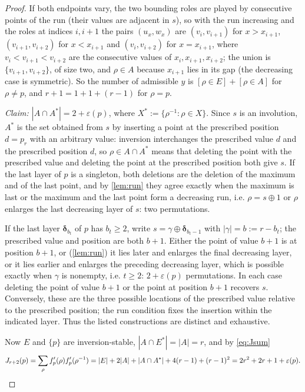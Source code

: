 \documentclass[11pt,reqno]{amsart}
\theoremstyle{plain}
\theoremstyle{definition}
\theoremstyle{remark}
\newcommand{\dd}{\boldsymbol{\delta}}
\newcommand{\bb}[1]{\left[#1\right]}
\begin{document}
\begin{proof}
If both endpoints vary, the two bounding roles are played by consecutive points of the run (their values are adjacent in $s$), so with the run increasing and the roles at indices $i,i+1$ the pairs $(u_x,w_x)$ are $(v_i,v_{i+1})$ for $x>x_{i+1}$, $(v_{i+1},v_{i+2})$ for $x<x_{i+1}$ and $(v_i,v_{i+2})$ for $x=x_{i+1}$, where $v_i<v_{i+1}<v_{i+2}$ are the consecutive values of $x_i,x_{i+1},x_{i+2}$; the union is $\{v_{i+1},v_{i+2}\}$, of size two, and $\rho\in A$ because $x_{i+1}$ lies in its gap (the decreasing case is symmetric). So the number of admissible $y$ is $\bb{\rho\in E}+\bb{\rho\in A}$ for $\rho\ne p$, and $r+1=1+1+(r-1)$ for $\rho=p$.

\emph{Claim: $|A\cap A^{*}|=2+\varepsilon(p)$}, where $X^*:=\{\rho^{-1}:\rho\in X\}$. Since $s$ is an involution, $A^*$ is the set obtained from $s$ by inserting a point at the prescribed position
$d=p_r$ with an arbitrary value: inversion interchanges the prescribed
value $d$ and the prescribed position $d$, so $\rho\in A\cap A^*$ means that deleting the point with the prescribed value and deleting the point at the prescribed position both give $s$. If the last layer of $p$ is a singleton, both deletions are the deletion of the maximum and of the last point, and by \cref{lem:run} they agree exactly when the maximum is last or the maximum and the last point form a decreasing run, i.e. $\rho=s\oplus1$ or $\rho$ enlarges the last decreasing layer of $s$: two permutations. 

If the last layer $\dd_{b_t}$ of $p$ has $b_t\ge2$, write $s=\gamma\oplus\dd_{b_t-1}$ with $|\gamma|=b:=r-b_t$; the prescribed value and position are both $b+1$. Either the point of value $b+1$ is at position $b+1$, or (\cref{lem:run}) it lies later and enlarges the final decreasing layer, or it lies earlier and enlarges the preceding decreasing layer, which is possible exactly when $\gamma$ is nonempty, i.e. $t\ge2$: $2+\varepsilon(p)$ permutations.
In each case deleting the point of value $b+1$ or the point at position
$b+1$ recovers $s$. Conversely, these are the three possible locations
of the prescribed value relative to the prescribed position; the run
condition fixes the insertion within the indicated layer. Thus the
listed constructions are distinct and exhaustive.

Now $E$ and $\{p\}$ are inversion-stable, $|A\cap E^*|=|A|=r$, and by \eqref{eq:Jsum}
\[
J_{r+2}(p)=\sum_\rho f'_p(\rho)f'_p(\rho^{-1})=|E|+2|A|+|A\cap A^*|+4(r-1)+(r-1)^2=2r^2+2r+1+\varepsilon(p).\qedhere
\]
\end{proof}
\end{document}
